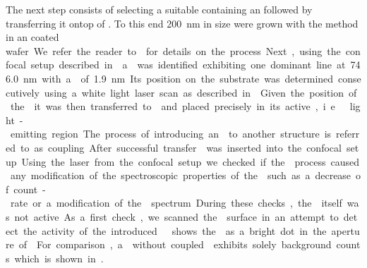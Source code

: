 	The next step consists of selecting a suitable \nd containing an \siv followed by transferring it ontop of \BmFour. To this end \nds \SI{200}{\nm} in size were grown with the \CVD method in an \ir coated \si wafer. We refer the reader to  for details on the process.

	Next, using the confocal setup described in  a \nd was identified exhibiting one dominant line at \SI{746.0}{nm} with a \lw of \SI{1.9}{nm}. Its position on the substrate was determined consecutively using a white light laser scan as described in . Given the position of the \nd it was then transferred to \BmFour and placed precisely in its active, i.e.\ light-emitting region. The process of introducing an \siv to another structure is referred to as coupling.

	After successful transfer \BmFour was inserted into the confocal setup.
	Using the laser from the confocal setup we checked if the \pp process caused any modification of the spectroscopic properties of the \siv such as a decrease of count-rate or a modification of the \fl spectrum. During these checks, the \VCSEL itself was not active.

	As a first check, we scanned the \VCSEL surface in an attempt to detect the activity of the introduced \siv.  shows the \siv as a bright dot in the aperture of \BmFour. For comparison, a \Vcsel without coupled \siv exhibits solely background counts which is shown in .

